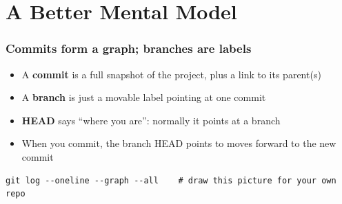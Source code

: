 \documentclass[aspectratio=169,10pt,compress]{beamer}
\begin{document}
\section[Model]{A Better Mental Model}

\begin{frame}[t,fragile] \frametitle{Commits form a graph; branches are labels}
  \begin{center}
  \end{center}

  \begin{itemize}
    \item A \textbf{commit} is a full snapshot of the project, plus a link to its parent(s)
    \item A \textbf{branch} is just a movable label pointing at one commit
    \item \textbf{HEAD} says ``where you are'': normally it points at a branch
    \item When you commit, the branch HEAD points to moves forward to the new commit
  \end{itemize}

\begin{lstlisting}
git log --oneline --graph --all    # draw this picture for your own repo
\end{lstlisting}
\end{frame}
\end{document}
